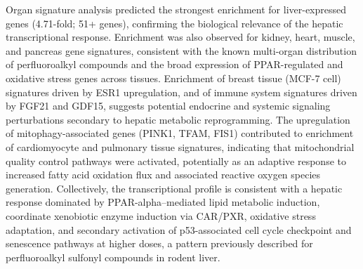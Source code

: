 Organ signature analysis predicted the strongest enrichment for liver-expressed genes (4.71-fold; 51+ genes), confirming the biological relevance of the hepatic transcriptional response. Enrichment was also observed for kidney, heart, muscle, and pancreas gene signatures, consistent with the known multi-organ distribution of perfluoroalkyl compounds and the broad expression of PPAR-regulated and oxidative stress genes across tissues. Enrichment of breast tissue (MCF-7 cell) signatures driven by ESR1 upregulation, and of immune system signatures driven by FGF21 and GDF15, suggests potential endocrine and systemic signaling perturbations secondary to hepatic metabolic reprogramming. The upregulation of mitophagy-associated genes (PINK1, TFAM, FIS1) contributed to enrichment of cardiomyocyte and pulmonary tissue signatures, indicating that mitochondrial quality control pathways were activated, potentially as an adaptive response to increased fatty acid oxidation flux and associated reactive oxygen species generation. Collectively, the transcriptional profile is consistent with a hepatic response dominated by PPAR-alpha–mediated lipid metabolic induction, coordinate xenobiotic enzyme induction via CAR/PXR, oxidative stress adaptation, and secondary activation of p53-associated cell cycle checkpoint and senescence pathways at higher doses, a pattern previously described for perfluoroalkyl sulfonyl compounds in rodent liver.

